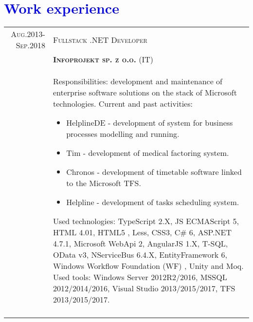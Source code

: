 \documentclass[a4paper,12pt]{article}
\begin{document}
\section{\textcolor{Blue}{Work experience}}
\begin{tabular}{r|p{12cm}}
\textsc{Aug.2013-Sep.2018}
	&\textsc{Fullstack .NET Developer}\\
	&\textsc{\textbf{Infoprojekt sp. z o.o.}} (IT) \\
	&\footnotesize{
		Responsibilities: development and maintenance of enterprise software solutions on the stack of Microsoft technologies. \newline
		Current and past activities:
		\begin{itemize}
			\item HelplineDE - development of system for business processes modelling and running.
			\item Tim -  development of medical factoring system.
		    \item Chronos - development of timetable software linked to the Microsoft TFS.
			\item Helpline - development of tasks scheduling system.
		\end{itemize}
		Used technologies: \newline
		TypeScript 2.X, JS ECMAScript 5, HTML 4.01, HTML5 , Less, CSS3, C\# 6, ASP.NET 4.7.1, Microsoft WebApi 2, AngularJS 1.X, T-SQL,
		OData v3, NServiceBus 6.4.X, EntityFramework 6, Windows Workflow Foundation (WF) , Unity and Moq. \newline
		Used tools: \newline
		Windows Server 2012R2/2016, MSSQL 2012/2014/2016, Visual Studio 2013/2015/2017, TFS 2013/2015/2017.
	}\\
	\multicolumn{2}{c}{}\\


\end{tabular}
\end{document}
